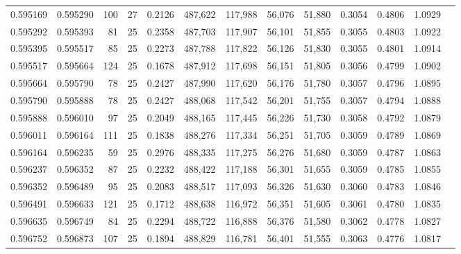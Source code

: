\begin{tabular}{rrrrrrrrrrrrr}
0.595169 & 0.595290 &   100 &  27 &                                     0.2126 & 487,622 & 117,988 &  56,076 &  51,880 & 0.3054 & 0.4806 & 1.0929 \\
0.595292 & 0.595393 &    81 &  25 &                                     0.2358 & 487,703 & 117,907 &  56,101 &  51,855 & 0.3055 & 0.4803 & 1.0922 \\
0.595395 & 0.595517 &    85 &  25 &                                     0.2273 & 487,788 & 117,822 &  56,126 &  51,830 & 0.3055 & 0.4801 & 1.0914 \\
0.595517 & 0.595664 &   124 &  25 &                                     0.1678 & 487,912 & 117,698 &  56,151 &  51,805 & 0.3056 & 0.4799 & 1.0902 \\
0.595664 & 0.595790 &    78 &  25 &                                     0.2427 & 487,990 & 117,620 &  56,176 &  51,780 & 0.3057 & 0.4796 & 1.0895 \\
0.595790 & 0.595888 &    78 &  25 &                                     0.2427 & 488,068 & 117,542 &  56,201 &  51,755 & 0.3057 & 0.4794 & 1.0888 \\
0.595888 & 0.596010 &    97 &  25 &                                     0.2049 & 488,165 & 117,445 &  56,226 &  51,730 & 0.3058 & 0.4792 & 1.0879 \\
0.596011 & 0.596164 &   111 &  25 &                                     0.1838 & 488,276 & 117,334 &  56,251 &  51,705 & 0.3059 & 0.4789 & 1.0869 \\
0.596164 & 0.596235 &    59 &  25 &                                     0.2976 & 488,335 & 117,275 &  56,276 &  51,680 & 0.3059 & 0.4787 & 1.0863 \\
0.596237 & 0.596352 &    87 &  25 &                                     0.2232 & 488,422 & 117,188 &  56,301 &  51,655 & 0.3059 & 0.4785 & 1.0855 \\
0.596352 & 0.596489 &    95 &  25 &                                     0.2083 & 488,517 & 117,093 &  56,326 &  51,630 & 0.3060 & 0.4783 & 1.0846 \\
0.596491 & 0.596633 &   121 &  25 &                                     0.1712 & 488,638 & 116,972 &  56,351 &  51,605 & 0.3061 & 0.4780 & 1.0835 \\
0.596635 & 0.596749 &    84 &  25 &                                     0.2294 & 488,722 & 116,888 &  56,376 &  51,580 & 0.3062 & 0.4778 & 1.0827 \\
0.596752 & 0.596873 &   107 &  25 &                                     0.1894 & 488,829 & 116,781 &  56,401 &  51,555 & 0.3063 & 0.4776 & 1.0817 \\

\end{tabular}

